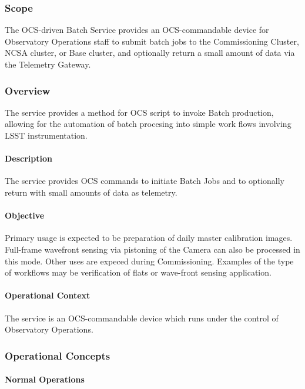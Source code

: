 \subsubsection{Scope}

The OCS-driven Batch Service provides an OCS-commandable device for Observatory
Operations staff to submit batch jobs to the Commissioning Cluster, NCSA cluster, or Base cluster, and optionally return a small amount of data via the Telemetry Gateway.

\subsubsection{Overview}

The service provides a method for OCS script to invoke Batch
production, allowing for the automation of batch procesing into simple work
flows involving LSST instrumentation.


\paragraph{Description}

The service provides OCS commands to initiate Batch Jobs and to optionally
return with small amounts of data as telemetry.

\paragraph{Objective}

Primary usage is expected to be preparation of daily master calibration images.  Full-frame wavefront sensing via pistoning of the Camera can also be processed in this mode.  Other uses are expeced during Commissioning.  Examples of the type of workflows may be verification of flats or wave-front sensing application.


\paragraph{Operational Context}

The service is an OCS-commandable device which runs under the control of
Observatory  Operations.

\subsubsection{Operational Concepts}

\paragraph{Normal Operations}


